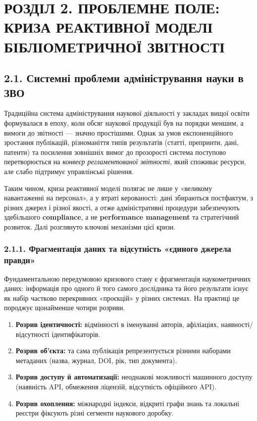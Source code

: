\section*{РОЗДІЛ 2. ПРОБЛЕМНЕ ПОЛЕ: КРИЗА РЕАКТИВНОЇ МОДЕЛІ БІБЛІОМЕТРИЧНОЇ ЗВІТНОСТІ}

\subsection*{2.1. Системні проблеми адміністрування науки в ЗВО}

Традиційна система адміністрування наукової діяльності у закладах вищої освіти формувалася в епоху, коли обсяг наукової продукції був на порядки меншим, а вимоги до звітності --- значно простішими. Однак за умов експоненційного зростання публікацій, різноманіття типів результатів (статті, препринти, дані, патенти) та посилення зовнішніх вимог до прозорості система поступово перетворюється на \textit{конвеєр регламентованої звітності}, який споживає ресурси, але слабо підтримує управлінські рішення.

Таким чином, криза реактивної моделі полягає не лише у «великому навантаженні на персонал», а у втраті керованості: дані збираються постфактум, з різних джерел і різної якості, а отже адміністративні процедури забезпечують здебільшого \textbf{compliance}, а не \textbf{performance management} та стратегічний розвиток. Далі розглянуто ключові механізми цієї кризи.

\subsubsection*{2.1.1. Фрагментація даних та відсутність «єдиного джерела правди»}

Фундаментальною передумовою кризового стану є фрагментація наукометричних даних: інформація про одного й того самого дослідника та його результати існує як набір частково перекривних «проєкцій» у різних системах. На практиці це породжує щонайменше чотири розриви.

\begin{enumerate}[leftmargin=*,itemsep=0.2em]
\item \textbf{Розрив ідентичності:} відмінності в іменуванні авторів, афіліаціях, наявності/відсутності ідентифікаторів.
\item \textbf{Розрив об'єкта:} та сама публікація репрезентується різними наборами метаданих (назва, журнал, DOI, рік, тип документа).
\item \textbf{Розрив доступу й автоматизації:} неоднакові можливості машинного доступу (наявність API, обмеження ліцензій, відсутність офіційного API).
\item \textbf{Розрив охоплення:} міжнародні індекси, відкриті графи знань та локальні реєстри фіксують різні сегменти наукового доробку.
\end{enumerate}

